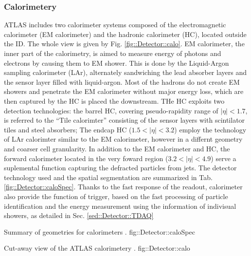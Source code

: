 \subsubsection{Calorimetery}
ATLAS includes two calorimeter systems composed of the electromagnetic calorimeter (EM calorimeter) and the hadronic calorimeter (HC), located outside the ID. 
The whole view is given by Fig. \ref{fig::Detector::calo}.
EM calorimeter, the inner part of the calorimetry, is aimed to measure energy of photons and electrons by causing them to EM shower. 
This is done by the Liquid-Argon sampling calorimeter (LAr), alternately sandwiching the lead absorber layers and the sensor layer filled with liquid-argon.
Most of the hadrons do not create EM showers and penetrate the EM calorimeter without major energy loss, which are then captured by the HC is placed the downstream. THe HC exploits two detection technologies: the barrel HC, covering pseudo-rapidity range of $|\eta|<1.7$, is referred to the ``Tile calorimter'' consisting of the sensor layers with scintilator tiles and steel absorbers; The endcap HC ($1.5<|\eta|<3.2$) employ the technology of LAr calorimter similar to the EM calorimeter, however in a differnt geometry and coarser cell granularity. In addition to the EM calorimeter and HC, the forward calorimeter located in the very foward region ($3.2<|\eta|<4.9$) serve a suplemental function capturing the defracted particles from jets. The detector technology used and the spatial segmentation are summarized in Tab. \ref{fig::Detector::caloSpec}.
Thanks to the fast response of the readout, calorimeter also provide the function of trigger, based on the fast processing of particle identification and the energy measurement using the information of indivisual showers, as detailed in Sec. \ref{sed::Detector::TDAQ}

\clearpage
{}
{Summary of geometries for calorimeters \cite{ATLAS_TDR}.}
{fig::Detector::caloSpec}
\clearpage


{Cut-away view of the ATLAS calorimetery \cite{ATLAS_exp}.}
{fig::Detector::calo}




